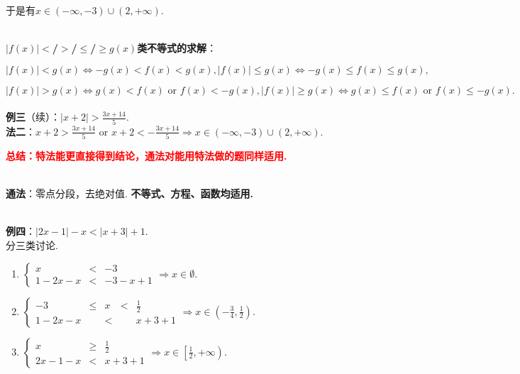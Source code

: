 \documentclass[8pt]{article}
\begin{document}
					于是有$x\in(-\infty, -3)\cup(2, +\infty).$

				~\\

				\textbf{$|f(x)|$$<$/$>$/$\leq$/$\geq$$g(x)$类不等式的求解}：

				$$|f(x)|<g(x)\Leftrightarrow -g(x)<f(x)<g(x), |f(x)|\leq g(x)\Leftrightarrow -g(x)\leq f(x)\leq g(x),$$

				$$|f(x)|>g(x)\Leftrightarrow g(x)<f(x) \text{ or } f(x)<-g(x), |f(x)|\geq g(x)\Leftrightarrow g(x)\leq f(x) \text{ or } f(x)\leq -g(x).$$
				~\\

				\textbf{例三}（续）：$\displaystyle |x+2|>\frac{3x+14}{5}.$
				~\\

					\textbf{法二}：$\displaystyle x+2>\frac{3x+14}{5} \text{ or } x+2<-\frac{3x+14}{5} \Rightarrow x\in(-\infty, -3)\cup(2, +\infty).$

					\textcolor{red}{\textbf{总结：特法能更直接得到结论，通法对能用特法做的题同样适用.}}

				~\\

				\textbf{通法}：零点分段，去绝对值. \textbf{不等式、方程、函数均适用.}

				~\\

				\textbf{例四}：$|2x-1|-x<|x+3|+1.$
					~\\

					分三类讨论.

					\begin{enumerate}[label=$\arabic*^{\circ}$]
						\item $\left\{\begin{array}{rcl}x&<&-3\\1-2x-x&<&-3-x+1\end{array}\right.\Rightarrow x\in\emptyset.$
						\item $\left\{\begin{array}{rcccl}-3&\leq&x&<&\displaystyle\frac{1}{2}\\1-2x-x&&<&&x+3+1\end{array}\right.\Rightarrow x\in\displaystyle\left(-\frac{3}{4}, \frac{1}{2}\right).$
						\item $\left\{\begin{array}{rcl}x&\geq&\displaystyle\frac{1}{2}\\2x-1-x&<&x+3+1\end{array}\right.\Rightarrow x\in\displaystyle\left[\frac{1}{2}, +\infty\right).$
					\end{enumerate}
\end{document}
